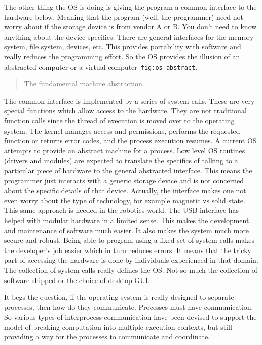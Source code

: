 The other thing the OS is doing is giving the program a common interface
to the hardware below. Meaning that the program (well, the programmer)
need not worry about if the storage device is from vendor A or B. You
don't need to know anything about the device specifics. There are
general interfaces for the memory system, file system, devices, etc.
This provides portability with software and really reduces the
programming effort. So the OS provides the illusion of an abstracted
computer or a virtual computer~\texttt{fig:os-abstract}.

\begin{quote}
The fundamental machine abstraction.
\end{quote}

The common interface is implemented by a series of system calls. These
are very special functions which allow access to the hardware. They are
not traditional function calls since the thread of execution is moved
over to the operating system. The kernel manages access and permissions,
performs the requested function or returns error codes, and the process
execution resumes. A current OS attempts to provide an abstract machine
for a process. Low level OS routines (drivers and modules) are expected
to translate the specifics of talking to a particular piece of hardware
to the general abstracted interface. This means the programmer just
interacts with a generic storage device and is not concerned about the
specific details of that device. Actually, the interface makes one not
even worry about the type of technology, for example magnetic vs solid
state. This same approach is needed in the robotics world. The USB
interface has helped with modular hardware in a limited sense. This
makes the development and maintenance of software much easier. It also
makes the system much more secure and robust. Being able to program
using a fixed set of system calls makes the developer's job easier which
in turn reduces errors. It means that the tricky part of accessing the
hardware is done by individuals experienced in that domain. The
collection of system calls really defines the OS. Not so much the
collection of software shipped or the choice of desktop GUI.

It begs the question, if the operating system is really designed to
separate processes, then how do they communicate. Processes must have
communication. So various types of interprocess communication have been
devised to support the model of breaking computation into multiple
execution contexts, but still providing a way for the processes to
communicate and coordinate.

